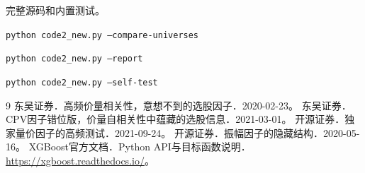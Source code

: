 \documentclass[10pt,compsoc,UTF8]{CjC}
\begin{document}
\noindent{}\quad 完整源码和内置测试。\par
\texttt{python code2\_new.py --compare-universes}\par
\texttt{python code2\_new.py --report}\par
\texttt{python code2\_new.py --self-test}

\begin{thebibliography}{9}\footnotesize
{} 东吴证券．高频价量相关性，意想不到的选股因子．2020-02-23。
 东吴证券．CPV因子错位版，价量自相关性中蕴藏的选股信息．2021-03-01。
 开源证券．独家量价因子的高频测试．2021-09-24。
 开源证券．振幅因子的隐藏结构．2020-05-16。
 XGBoost官方文档．Python API与目标函数说明．\url{https://xgboost.readthedocs.io/}。
\end{thebibliography}
\end{document}
